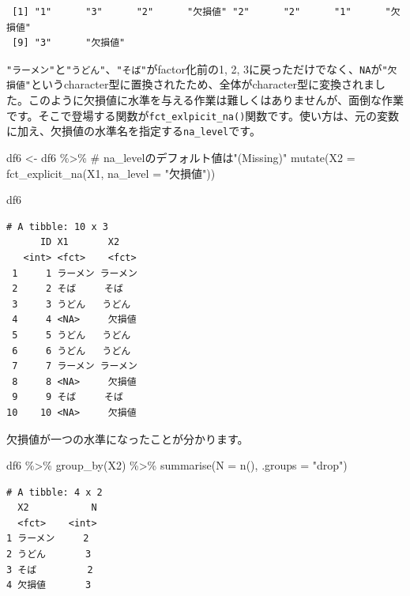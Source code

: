 \documentclass[
  a4paper,
  pandoc,
  ja=standard,
  jafont=haranoaji]{bxjsbook}
\newenvironment{Shaded}{\begin{snugshade}}{\end{snugshade}}
\newcommand{\AttributeTok}[1]{\textcolor[rgb]{0.00,0.48,0.65}{#1}}
\newcommand{\CommentTok}[1]{\textcolor[rgb]{0.37,0.37,0.37}{#1}}
\newcommand{\FunctionTok}[1]{\textcolor[rgb]{0.28,0.35,0.67}{#1}}
\newcommand{\NormalTok}[1]{\textcolor[rgb]{0.00,0.48,0.65}{#1}}
\newcommand{\OtherTok}[1]{\textcolor[rgb]{0.00,0.48,0.65}{#1}}
\newcommand{\SpecialCharTok}[1]{\textcolor[rgb]{0.37,0.37,0.37}{#1}}
\newcommand{\StringTok}[1]{\textcolor[rgb]{0.13,0.47,0.30}{#1}}
\begin{document}
\begin{verbatim}
 [1] "1"      "3"      "2"      "欠損値" "2"      "2"      "1"      "欠損値"
 [9] "3"      "欠損値"
\end{verbatim}

\texttt{"ラーメン"}と\texttt{"うどん"}、\texttt{"そば"}がfactor化前の1,
2,
3に戻っただけでなく、\texttt{NA}が\texttt{"欠損値"}というcharacter型に置換されたため、全体がcharacter型に変換されました。このように欠損値に水準を与える作業は難しくはありませんが、面倒な作業です。そこで登場する関数が\texttt{fct\_exlpicit\_na()}関数です。使い方は、元の変数に加え、欠損値の水準名を指定する\texttt{na\_level}です。

\begin{Shaded}
\begin{Highlighting}[numbers=left,,]
\NormalTok{df6 }\OtherTok{\textless{}{-}}\NormalTok{ df6 }\SpecialCharTok{\%\textgreater{}\%}
  \CommentTok{\# na\_levelのデフォルト値は"(Missing)"}
  \FunctionTok{mutate}\NormalTok{(}\AttributeTok{X2 =} \FunctionTok{fct\_explicit\_na}\NormalTok{(X1, }\AttributeTok{na\_level =} \StringTok{"欠損値"}\NormalTok{))}

\NormalTok{df6}
\end{Highlighting}
\end{Shaded}

\begin{verbatim}
# A tibble: 10 x 3
      ID X1       X2      
   <int> <fct>    <fct>   
 1     1 ラーメン ラーメン
 2     2 そば     そば    
 3     3 うどん   うどん  
 4     4 <NA>     欠損値  
 5     5 うどん   うどん  
 6     6 うどん   うどん  
 7     7 ラーメン ラーメン
 8     8 <NA>     欠損値  
 9     9 そば     そば    
10    10 <NA>     欠損値  
\end{verbatim}

欠損値が一つの水準になったことが分かります。

\begin{Shaded}
\begin{Highlighting}[numbers=left,,]
\NormalTok{df6 }\SpecialCharTok{\%\textgreater{}\%}
  \FunctionTok{group\_by}\NormalTok{(X2) }\SpecialCharTok{\%\textgreater{}\%}
  \FunctionTok{summarise}\NormalTok{(}\AttributeTok{N       =} \FunctionTok{n}\NormalTok{(),}
            \AttributeTok{.groups =} \StringTok{"drop"}\NormalTok{)}
\end{Highlighting}
\end{Shaded}

\begin{verbatim}
# A tibble: 4 x 2
  X2           N
  <fct>    <int>
1 ラーメン     2
2 うどん       3
3 そば         2
4 欠損値       3
\end{verbatim}
\end{document}
